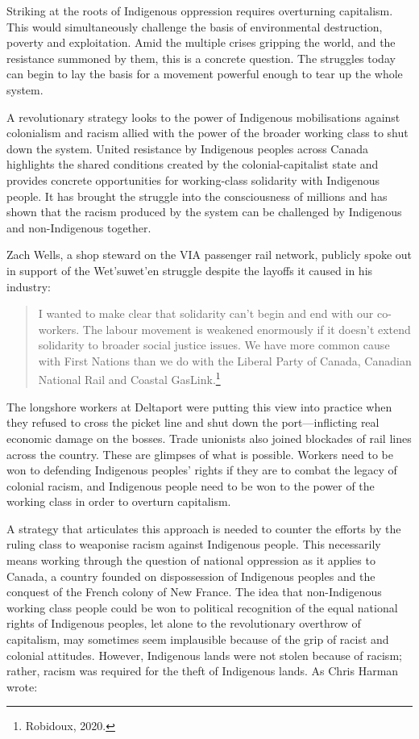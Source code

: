 Striking at the roots of Indigenous oppression requires overturning capitalism. This would simultaneously challenge the basis of environmental destruction, poverty and exploitation. Amid the multiple crises gripping the world, and the resistance summoned by them, this is a concrete question. The struggles today can begin to lay the basis for a movement powerful enough to tear up the whole system.

A revolutionary strategy looks to the power of Indigenous mobilisations against colonialism and racism allied with the power of the broader working class to shut down the system. United resistance by Indigenous peoples across Canada highlights the shared conditions created by the colonial-capitalist state and provides concrete opportunities for working-class solidarity with Indigenous people. It has brought the struggle into the consciousness of millions and has shown that the racism produced by the system can be challenged by Indigenous and non-Indigenous together.

Zach Wells, a shop steward on the VIA passenger rail network, publicly spoke out in support of the Wet'suwet'en struggle despite the layoffs it caused in his industry:

\blockquote{I wanted to make clear that solidarity can't begin and end with our co-workers. The labour movement is weakened enormously if it doesn't extend solidarity to broader social justice issues. We have more common cause with First Nations than we do with the Liberal Party of Canada, Canadian National Rail and Coastal GasLink.\footnote{Robidoux, 2020.}}

The longshore workers at Deltaport were putting this view into practice when they refused to cross the picket line and shut down the port---inflicting real economic damage on the bosses. Trade unionists also joined blockades of rail lines across the country. These are glimpses of what is possible. Workers need to be won to defending Indigenous peoples' rights if they are to combat the legacy of colonial racism, and Indigenous people need to be won to the power of the working class in order to overturn capitalism.

A strategy that articulates this approach is needed to counter the efforts by the ruling class to weaponise racism against Indigenous people. This necessarily means working through the question of national oppression as it applies to Canada, a country founded on dispossession of Indigenous peoples and the conquest of the French colony of New France. The idea that non-Indigenous working class people could be won to political recognition of the equal national rights of Indigenous peoples, let alone to the revolutionary overthrow of capitalism, may sometimes seem implausible because of the grip of racist and colonial attitudes. However, Indigenous lands were not stolen because of racism; rather, racism was required for the theft of Indigenous lands. As Chris Harman wrote:

